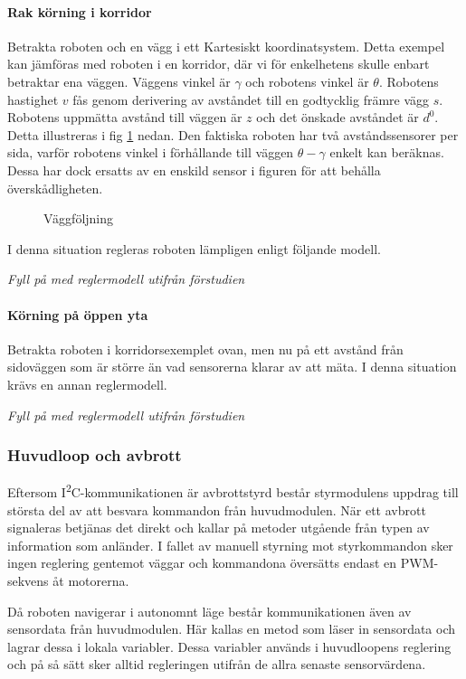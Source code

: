 \documentclass[11pt]{article}
\begin{document}
\begin{flushleft}
\paragraph{Rak körning i korridor} Betrakta roboten och en vägg i ett Kartesiskt koordinatsystem. Detta exempel kan jämföras med roboten i en korridor, där vi för enkelhetens skulle enbart betraktar ena väggen. Väggens vinkel är $\gamma$ och robotens vinkel är $\theta$. Robotens hastighet $v$ fås genom derivering av avståndet till en godtycklig främre vägg $s$. Robotens uppmätta avstånd till väggen är $z$ och det önskade avståndet är $d^0$. Detta illustreras i fig \ref{robotwall} nedan. Den faktiska roboten har två avståndssensorer per sida, varför robotens vinkel i förhållande till väggen $\theta - \gamma$ enkelt kan beräknas. Dessa har dock ersatts av en enskild sensor i figuren för att behålla överskådligheten.
\begin{figure}[H] 
\centering
\noindent{}
	\caption{Väggföljning\label{robotwall}}	
\end{figure}

I denna situation regleras roboten lämpligen enligt följande modell.

\textit{Fyll på med reglermodell utifrån förstudien}

\paragraph{Körning på öppen yta} Betrakta roboten i korridorsexemplet ovan, men nu på ett avstånd från sidoväggen som är större än vad sensorerna klarar av att mäta. I denna situation krävs en annan reglermodell.

\textit{Fyll på med reglermodell utifrån förstudien}

\subsubsection{Huvudloop och avbrott}
Eftersom I\textsuperscript{2}C-kommunikationen är avbrottstyrd består styrmodulens uppdrag till största del av att besvara kommandon från huvudmodulen. När ett avbrott signaleras betjänas det direkt och kallar på metoder utgående från typen av information som anländer. I fallet av manuell styrning mot styrkommandon sker ingen reglering gentemot väggar och kommandona översätts endast en PWM-sekvens åt motorerna.

Då roboten navigerar i autonomnt läge består kommunikationen även av sensordata från huvudmodulen. Här kallas en metod som läser in sensordata och lagrar dessa i lokala variabler. Dessa variabler används i huvudloopens reglering och på så sätt sker alltid regleringen utifrån de allra senaste sensorvärdena. 


\end{flushleft}
\end{document}
